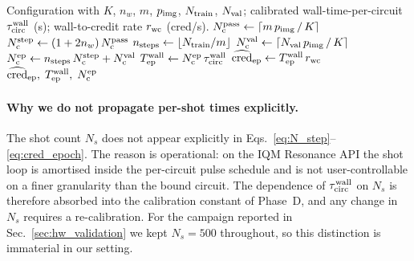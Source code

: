 \begin{algorithm}[t]
\caption{\texttt{estimate\_cost\_per\_epoch}$(\,$config$,\;\tau_{\rm circ}^{\rm wall},\;r_{\rm wc}\,)$ —
matches Phase~D code in \texttt{hybrid\_qcnn\_v4\_3\_0\_emerald.ipynb}.}
\label{alg:estimate-cost-per-epoch}
\begin{algorithmic}[1]
\Require Configuration with $K$, $n_w$, $m$, $p_{\rm img}$, $N_{\rm train}$,
         $N_{\rm val}$; calibrated wall-time-per-circuit
         $\tau_{\rm circ}^{\rm wall}$ (s); wall-to-credit rate $r_{\rm wc}$
         (cred/s).
\State $N_{\rm c}^{\rm pass} \gets \lceil m\, p_{\rm img}\,/\, K\rceil$
\State $N_{\rm c}^{\rm step} \gets (1+2 n_w)\,N_{\rm c}^{\rm pass}$
\State $n_{\rm steps} \gets \lfloor N_{\rm train}/m\rfloor$
\State $N_{\rm c}^{\rm val} \gets \lceil N_{\rm val}\, p_{\rm img}\,/\,K\rceil$
\State $N_{\rm c}^{\rm ep} \gets n_{\rm steps}\, N_{\rm c}^{\rm step} + N_{\rm c}^{\rm val}$
\State $T_{\rm ep}^{\rm wall} \gets N_{\rm c}^{\rm ep}\,\tau_{\rm circ}^{\rm wall}$
\State $\widehat{\mathrm{cred}}_{\rm ep} \gets T_{\rm ep}^{\rm wall}\,r_{\rm wc}$
\State \Return $\widehat{\mathrm{cred}}_{\rm ep},\; T_{\rm ep}^{\rm wall},\; N_{\rm c}^{\rm ep}$
\end{algorithmic}
\end{algorithm}

\paragraph{Why we do not propagate per-shot times explicitly.}
The shot count $N_s$ does not appear explicitly in
Eqs.~\eqref{eq:N_step}--\eqref{eq:cred_epoch}. The reason is operational: on
the IQM Resonance API the shot loop is amortised inside the per-circuit pulse
schedule and is not user-controllable on a finer granularity than the bound
circuit. The dependence of $\tau_{\rm circ}^{\rm wall}$ on $N_s$ is therefore
absorbed into the calibration constant of Phase~D, and any change in $N_s$
requires a re-calibration. For the campaign reported in Sec.~\ref{sec:hw_validation}
we kept $N_s=500$ throughout, so this distinction is immaterial in our setting.

